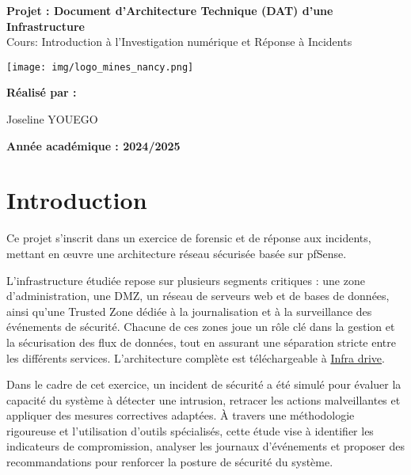 \documentclass[a4paper,12pt]{report}
\newcommand{\projecttitle}{Projet : Document d’Architecture Technique (DAT) d'une Infrastructure}
\newcommand{\subject}{Cours: Introduction à l'Investigation numérique et Réponse à Incidents}
\newcommand{\groupparticipants}{
    
        
       Joseline YOUEGO

    
}
\begin{document}
\begin{titlepage}
    \centering
    \vspace*{1cm}
    {\Huge \textbf{\projecttitle}} \\ %
    \vspace{0.5cm}
    {\Large \subject} \\ %
    \vspace{2cm}
    
    \texttt{[image: img/logo\_mines\_nancy.png]} \\ %
    \vspace{2cm}
    
    {\Large \textbf{Réalisé par :}} \\ %
    \vspace{0.5cm}
    \groupparticipants
    \vfill
    {\Large \textbf{Année académique : 2024/2025}} %
    \vspace*{1cm}
\end{titlepage}

\tableofcontents
\newpage

\chapter{Introduction}

Ce projet s’inscrit dans un exercice de forensic et de réponse aux incidents, mettant en œuvre une architecture réseau sécurisée basée sur pfSense.

L’infrastructure étudiée repose sur plusieurs segments critiques : une zone d’administration, une DMZ, un réseau de serveurs web et de bases de données, ainsi qu’une Trusted Zone dédiée à la journalisation et à la surveillance des événements de sécurité. Chacune de ces zones joue un rôle clé dans la gestion et la sécurisation des flux de données, tout en assurant une séparation stricte entre les différents services. L'architecture complète est téléchargeable à \href{https://drive.google.com/drive/folders/15aWWFLqg4ztTWTNyW5a9o76vVVQFWJB7?usp=sharing}{Infra drive}.

Dans le cadre de cet exercice, un incident de sécurité a été simulé pour évaluer la capacité du système à détecter une intrusion, retracer les actions malveillantes et appliquer des mesures correctives adaptées. À travers une méthodologie rigoureuse et l'utilisation d'outils spécialisés, cette étude vise à identifier les indicateurs de compromission, analyser les journaux d’événements et proposer des recommandations pour renforcer la posture de sécurité du système.
\end{document}
